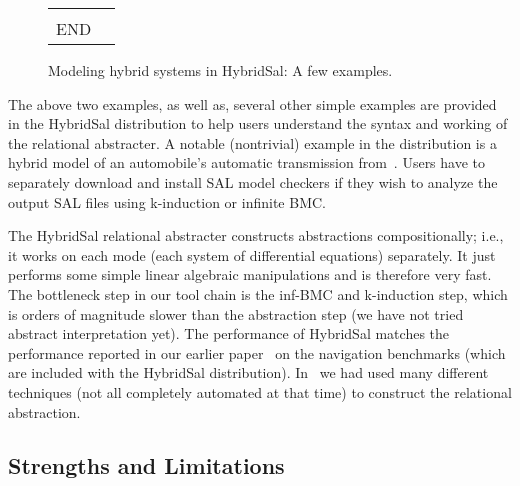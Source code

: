 \documentclass{llncs}
\begin{document}
\begin{figure}[htb!]
\begin{tt}
\begin{tabular}{ll}
\begin{minipage}{2in}
\begin{tabbing}
%
%
\\
END
\end{tabbing}
\end{minipage}
\end{tabular}
\end{tt}
\caption{Modeling hybrid systems in HybridSal: A few examples.}
\label{fig:ex}
\end{figure}

The above two examples, as well as,
several other simple examples are provided in the
HybridSal distribution to help
users understand the syntax and working of the
relational abstracter.  
A notable (nontrivial) example in the distribution is a hybrid
model of an automobile's automatic transmission from~\cite{ChutinanButts02:Mobies}.
Users have to separately
download and install SAL model checkers if they
wish to analyze the output SAL files using
k-induction or infinite BMC.

The HybridSal relational abstracter constructs abstractions
compositionally; i.e., it works on each mode 
(each system of differential equations) separately.
It just performs some simple linear algebraic manipulations
and is therefore very fast.  
The bottleneck step in our tool chain
is the inf-BMC and k-induction step,
which is orders of magnitude slower than the abstraction step
(we have not tried abstract interpretation yet).
The performance of HybridSal matches the performance reported 
in our earlier paper~\cite{ST11:CAVsmall} on the navigation
benchmarks (which are included with the HybridSal distribution).
In~\cite{ST11:CAVsmall} we had used many
different techniques (not all completely automated at that time)
to construct the relational abstraction.

\subsection{Strengths and Limitations}
\end{document}
